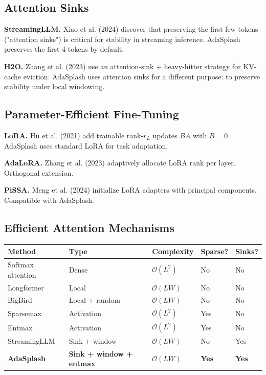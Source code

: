 \subsection{Attention Sinks}

\textbf{StreamingLLM.} Xiao et al. (2024) discover that preserving the first 
few tokens ("attention sinks") is critical for stability in streaming 
inference. AdaSplash preserves the first 4 tokens by default.

\textbf{H2O.} Zhang et al. (2023) use an attention-sink + heavy-hitter strategy 
for KV-cache eviction. AdaSplash uses attention sinks for a different purpose: 
to preserve stability under local windowing.

\subsection{Parameter-Efficient Fine-Tuning}

\textbf{LoRA.} Hu et al. (2021) add trainable rank-$r_L$ updates $B A$ with 
$B = 0$. AdaSplash uses standard LoRA for task adaptation.

\textbf{AdaLoRA.} Zhang et al. (2023) adaptively allocate LoRA rank per layer. 
Orthogonal extension.

\textbf{PiSSA.} Meng et al. (2024) initialize LoRA adapters with principal 
components. Compatible with AdaSplash.

\subsection{Efficient Attention Mechanisms}

\begin{table}[H]
\centering
\small
\begin{tabular}{lllll}
\toprule
\textbf{Method} & \textbf{Type} & \textbf{Complexity} & \textbf{Sparse?} & \textbf{Sinks?} \\
\midrule
Softmax attention & Dense & $\mathcal{O}(L^2)$ & No & No \\
Longformer & Local & $\mathcal{O}(L W)$ & No & No \\
BigBird & Local + random & $\mathcal{O}(L W)$ & No & No \\
Sparsemax & Activation & $\mathcal{O}(L^2)$ & Yes & No \\
Entmax & Activation & $\mathcal{O}(L^2)$ & Yes & No \\
StreamingLLM & Sink + window & $\mathcal{O}(L W)$ & No & Yes \\
\textbf{AdaSplash} & \textbf{Sink + window + entmax} & \textbf{$\mathcal{O}(L W)$} & \textbf{Yes} & \textbf{Yes} \\
\bottomrule
\end{tabular}
\end{table}

